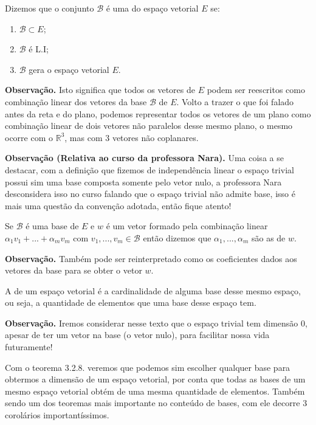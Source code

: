 \documentclass[../main.tex]{subfiles}
\begin{document}
	\begin{definicao}
		Dizemos que o conjunto $\mathcal{B}$ é uma  do espaço vetorial $E$ se:
		\begin{enumerate}[itemsep=0pt]
			\item $\mathcal{B} \subset E$;
			\item $\mathcal{B}$ é L.I;
			\item $\mathcal{B}$ gera o espaço vetorial $E$.
		\end{enumerate}
	\end{definicao}
	
	\textbf{Observação.} Isto significa que todos os vetores de $E$ podem ser reescritos como combinação linear dos vetores da base $\mathcal{B}$ de $E$. Volto a trazer o que foi falado antes da reta e do plano, podemos representar todos os vetores de um plano como combinação linear de dois vetores não paralelos desse mesmo plano, o mesmo ocorre com o $\mathbb{R}^3$, mas com 3 vetores não coplanares.
	
	\textbf{Observação (Relativa ao curso da professora Nara).} Uma coisa a se destacar, com a definição que fizemos de independência linear o espaço trivial possui sim uma base composta somente pelo vetor nulo, a professora Nara desconsidera isso no curso falando que o espaço trivial não admite base, isso é mais uma questão da convenção adotada, então fique atento!
	\smallskip
		
	\begin{definicao}
		Se $\mathcal{B}$ é uma base de $E$ e $w$ é um vetor formado pela combinação linear $\alpha_1 v_1 + ... + \alpha_m v_m$ com $v_1, ..., v_m \in \mathcal{B}$ então dizemos que $\alpha_1, ..., \alpha_m$ são as  de $w$.
	\end{definicao}
	
	\textbf{Observação.} Também pode ser reinterpretado como os coeficientes dados aos vetores da base para se obter o vetor $w$.
	\smallskip
	
	\begin{definicao}
		A  de um espaço vetorial é a cardinalidade de alguma base desse mesmo espaço, ou seja, a quantidade de elementos que uma base desse espaço tem.
	\end{definicao}
	
	\textbf{Observação.} Iremos considerar nesse texto que o espaço trivial tem dimensão $0$, apesar de ter um vetor na base (o vetor nulo), para facilitar nossa vida futuramente!
	
	Com o teorema 3.2.8. veremos que podemos sim escolher qualquer base para obtermos a dimensão de um espaço vetorial, por conta que todas as bases de um mesmo espaço vetorial obtém de uma mesma quantidade de elementos. Também sendo um dos teoremas mais importante no conteúdo de bases, com ele decorre 3 corolários importantíssimos.
	
\end{document}
